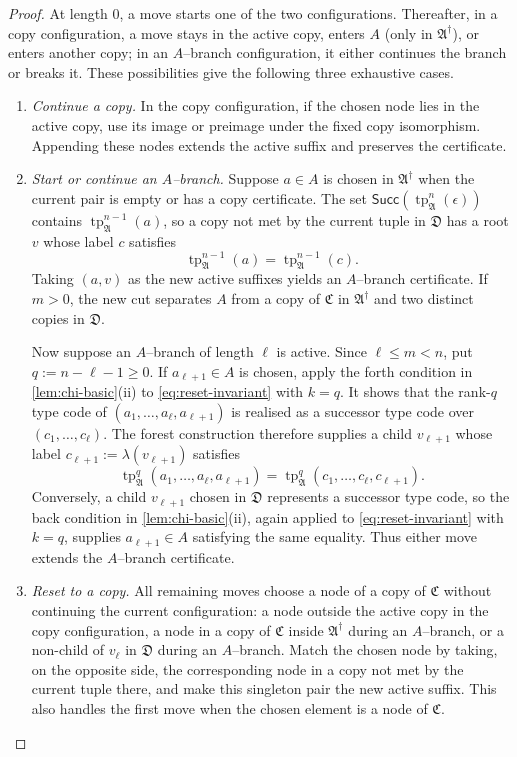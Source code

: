 \documentclass{lmcs}
\newcommand{\tp}{\operatorname{tp}}
\newcommand{\A}{\mathfrak{A}}
\newcommand{\C}{\mathfrak{C}}
\newcommand{\D}{\mathfrak{D}}
\begin{document}
\begin{proof}
At length $0$, a move starts one of the two configurations.  Thereafter, in a
copy configuration, a move stays in the active copy, enters $A$ (only in
$\A^{\dagger}$), or enters another copy; in an $A$--branch configuration, it
either continues the branch or breaks it.  These possibilities give the
following three exhaustive cases.

\begin{enumerate}[label=\textup{(\roman*)}]
\item \emph{Continue a copy.}
In the copy configuration, if the chosen node lies in the active copy, use
its image or preimage under the fixed copy isomorphism.  Appending these nodes
extends the active suffix and preserves the certificate.

\item \emph{Start or continue an $A$--branch.}
Suppose $a\in A$ is chosen in $\A^{\dagger}$ when the current pair is empty
or has a copy certificate.  The set
$\mathsf{Succ}(\tp_{\A}^{n}(\epsilon))$ contains
$\tp_{\A}^{n-1}(a)$, so a copy not met by the current tuple in $\D$ has a
root $v$ whose label $c$ satisfies
\[
   \tp_{\A}^{n-1}(a)=\tp_{\A}^{n-1}(c).
\]
Taking $(a,v)$ as the new active suffixes yields an $A$--branch certificate.
If $m>0$, the new cut separates $A$ from a copy of $\C$ in
$\A^{\dagger}$ and two distinct copies in $\D$.

Now suppose an $A$--branch of length $\ell$ is active.  Since
$\ell\leq m<n$, put $q:=n-\ell-1\geq0$.  If $a_{\ell+1}\in A$ is chosen,
apply the forth condition in \cref{lem:chi-basic}(ii) to
\eqref{eq:reset-invariant} with
$k=q$.  It shows that the rank-$q$ type code of
$(a_1,\ldots,a_\ell,a_{\ell+1})$ is realised as a successor type code over
$(c_1,\ldots,c_\ell)$.  The forest construction therefore supplies a child
$v_{\ell+1}$ whose label $c_{\ell+1}:=\lambda(v_{\ell+1})$ satisfies
\begin{equation}
  \tp_{\A}^{q}(a_1,\ldots,a_\ell,a_{\ell+1})
  =
  \tp_{\A}^{q}(c_1,\ldots,c_\ell,c_{\ell+1}).
  \label{eq:reset-invariant-plus}
\end{equation}
Conversely, a child $v_{\ell+1}$ chosen in $\D$ represents a successor type
code, so the back condition in \cref{lem:chi-basic}(ii), again applied to
\eqref{eq:reset-invariant} with $k=q$, supplies $a_{\ell+1}\in A$ satisfying the same
equality.  Thus either move extends the $A$--branch certificate.

\item \emph{Reset to a copy.}
All remaining moves choose a node of a copy of $\C$ without continuing the
current configuration: a node outside the active copy in the copy
configuration, a node in a copy of $\C$ inside $\A^{\dagger}$ during an
$A$--branch, or a non-child of $v_\ell$ in $\D$ during an $A$--branch.  Match
the chosen node by taking, on the opposite side, the corresponding node in a
copy not met by the current tuple there, and make this singleton pair the new
active suffix.  This also handles the first move when the chosen element is a
node of $\C$.


\end{enumerate}
\end{proof}
\end{document}
